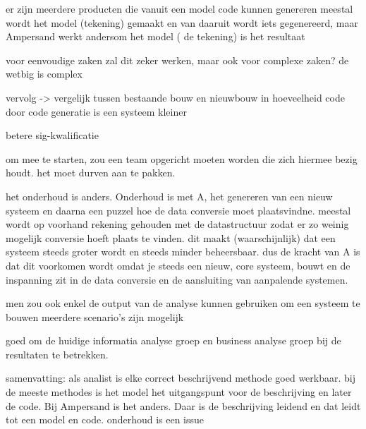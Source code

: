er zijn meerdere producten die vanuit een model code kunnen genereren
meestal wordt het model (tekening) gemaakt en van daaruit wordt iets gegenereerd, maar Ampersand werkt andersom
het model ( de tekening) is het resultaat

voor eenvoudige zaken zal dit zeker werken, maar ook voor complexe zaken?
de wetbig is complex

vervolg -> vergelijk tussen bestaande bouw en nieuwbouw in hoeveelheid code
door code generatie is een systeem kleiner

betere sig-kwalificatie

om mee te starten, zou een team opgericht moeten worden die zich hiermee bezig houdt. het moet durven aan te pakken.

het onderhoud is anders. Onderhoud is met A, het genereren van een nieuw systeem en daarna een puzzel hoe de data conversie moet plaatsvindne.
meestal wordt op voorhand rekening gehouden met de datastructuur zodat er zo weinig mogelijk conversie hoeft plaats te vinden.
dit maakt (waarschijnlijk) dat een systeem steeds groter wordt en steeds minder beheersbaar. 
dus de kracht van A is dat dit voorkomen wordt omdat je steeds een nieuw, core systeem, bouwt en de inspanning zit in de data conversie en de aansluiting van aanpalende systemen.

men zou ook enkel de output van de analyse kunnen gebruiken om een systeem te bouwen
meerdere scenario's zijn mogelijk

goed om de huidige informatia analyse groep en business analyse groep bij de resultaten te betrekken.

samenvatting:
als analist is elke correct beschrijvend methode goed werkbaar.
bij de meeste methodes is het model het uitgangspunt voor de beschrijving en later de code.
Bij Ampersand is het anders. 
Daar is de beschrijving leidend en dat leidt tot een model en code.
onderhoud is een issue
